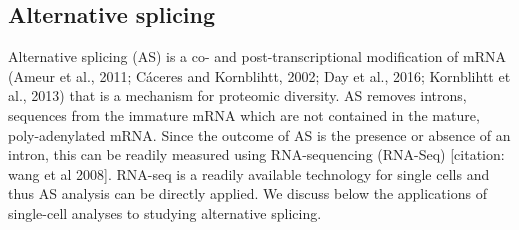 \subsection{Alternative splicing}
Alternative splicing (AS) is a co- and post-transcriptional modification of mRNA (Ameur et al., 2011; Cáceres and Kornblihtt, 2002; Day et al., 2016; Kornblihtt et al., 2013) that is a mechanism for proteomic diversity. AS removes introns, sequences from the immature mRNA which are not contained in the mature, poly-adenylated mRNA. Since the outcome of AS is the presence or absence of an intron, this can be readily measured using RNA-sequencing (RNA-Seq) [citation: wang et al 2008]. RNA-seq is a readily available technology for single cells and thus AS analysis can be directly applied. We discuss below the applications of single-cell analyses to studying alternative splicing.
